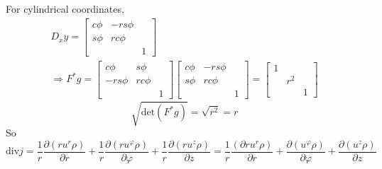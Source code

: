 \documentclass[twoside,landscape,10pt]{amsart}
\theoremstyle{plain}
\theoremstyle{definition}
\theoremstyle{remark}
\theoremstyle{remark}
\begin{document}
\begin{multicols*}{2}
For cylindrical coordinates,
\[
\begin{gathered}
  D_xy = \left[ \begin{matrix} c{\phi } & - rs{\phi} & \\ 
      s{\phi} & rc{\phi} & \\
      & & 1 \end{matrix} \right] \\ 
  \Longrightarrow F^*g = \left[ \begin{matrix} c{\phi } & s{\phi} & \\ 
      -rs{\phi} & rc{\phi} & \\
      & & 1 \end{matrix} \right] \left[ \begin{matrix} c{\phi } & - rs{\phi} & \\ 
      s{\phi} & rc{\phi} & \\
      & & 1 \end{matrix} \right]  = \left[ \begin{matrix} 1 & & \\ & r^2 & \\ & & 1 \end{matrix} \right]
\end{gathered}
\]
\[
\sqrt{ \text{det}(F^*g) } = \sqrt{r^2} =r 
\]
So
\[
\text{div}j = \frac{1}{r} \frac{ \partial (ru^r\rho ) }{ \partial r } +\frac{1}{r} \frac{ \partial (ru^{\varphi } \rho ) }{ \partial \varphi } + \frac{1}{r} \frac{ \partial (ru^z \rho ) }{ \partial z} = \frac{1}{r} \frac{ (\partial ru^r \rho  )}{ \partial r } + \frac{ \partial (u^{\varphi} \rho ) }{ \partial \varphi } + \frac{ \partial (u^z \rho ) }{ \partial z}
\]



\end{multicols*}
\end{document}
